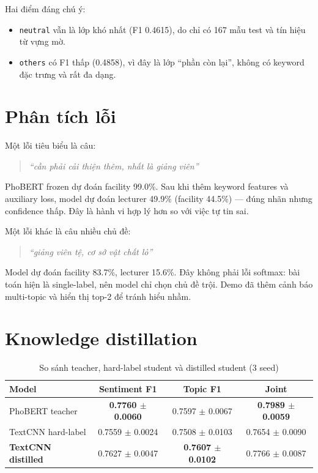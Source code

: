 \documentclass[12pt,a4paper]{report}
\begin{document}
Hai điểm đáng chú ý:

\begin{itemize}[leftmargin=1.2cm]
  \item \texttt{neutral} vẫn là lớp khó nhất (F1 0.4615), do chỉ có 167 mẫu test và tín hiệu từ vựng mờ.
  \item \texttt{others} có F1 thấp (0.4858), vì đây là lớp “phần còn lại”, không có keyword đặc trưng và rất đa dạng.
\end{itemize}

\section{Phân tích lỗi}

Một lỗi tiêu biểu là câu:

\begin{quote}
\textit{“cần phải cải thiện thêm, nhất là giảng viên”}
\end{quote}

PhoBERT frozen dự đoán facility 99.0\%. Sau khi thêm keyword features và auxiliary loss, model dự đoán lecturer 49.9\% (facility 44.5\%) — đúng nhãn nhưng confidence thấp. Đây là hành vi hợp lý hơn so với việc tự tin sai.

Một lỗi khác là câu nhiều chủ đề:

\begin{quote}
\textit{“giảng viên tệ, cơ sở vật chất lỏ”}
\end{quote}

Model dự đoán facility 83.7\%, lecturer 15.6\%. Đây không phải lỗi softmax: bài toán hiện là single-label, nên model chỉ chọn chủ đề trội. Demo đã thêm cảnh báo multi-topic và hiển thị top-2 để tránh hiểu nhầm.

\section{Knowledge distillation}

\begin{table}[H]
\centering
\caption{So sánh teacher, hard-label student và distilled student (3 seed)}
\begin{tabular}{@{}lccc@{}}
\toprule
\textbf{Model} & \textbf{Sentiment F1} & \textbf{Topic F1} & \textbf{Joint} \\
\midrule
PhoBERT teacher & \textbf{0.7760 \(\pm\) 0.0060} & 0.7597 \(\pm\) 0.0067 & \textbf{0.7989 \(\pm\) 0.0059} \\
TextCNN hard-label & 0.7559 \(\pm\) 0.0024 & 0.7508 \(\pm\) 0.0103 & 0.7654 \(\pm\) 0.0090 \\
\textbf{TextCNN distilled} & 0.7627 \(\pm\) 0.0047 & \textbf{0.7607 \(\pm\) 0.0102} & 0.7766 \(\pm\) 0.0087 \\
\bottomrule
\end{tabular}
\end{table}
\end{document}
